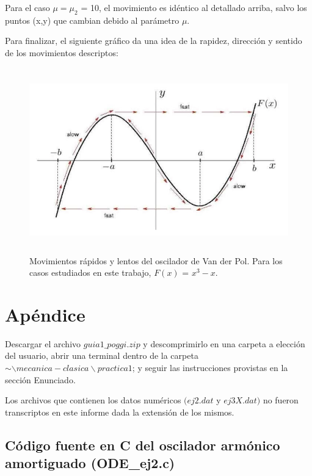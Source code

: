 \documentclass[a4paper,12pt]{article}
\begin{document}
\begin{itemize}
Para el caso $\mu = \mu_2$ = 10, el movimiento es id\'entico al detallado arriba, salvo los puntos (x,y) que cambian debido al par\'ametro $\mu$.

Para finalizar, el siguiente gr\'afico da una idea de la rapidez, direcci\'on y sentido de los movimientos descriptos:


\begin{figure}[H]
\begin{center}
\includegraphics[height=8cm]{grafico_movimientos.jpg}
\caption[width=5cm]{Movimientos r\'apidos y lentos del oscilador de Van der Pol. Para los casos estudiados en este trabajo, $F(x)$ = $x^3 - x$.}
\end{center}
\end{figure}


\end{itemize}

\section{Ap\'endice}

Descargar el archivo $guia1\_poggi.zip$ y descomprimirlo en una carpeta a elecci\'on del usuario, abrir una terminal dentro de la carpeta $\sim \backslash mecanica-clasica\backslash practica1$; y seguir las instrucciones provistas en la secci\'on Enunciado.

Los archivos que contienen los datos num\'ericos $(ej2.dat$ y $ej3X.dat)$ no fueron transcriptos en este informe dada la extensi\'on de los mismos.


\subsection{C\'odigo fuente en C del oscilador arm\'onico amortiguado (ODE\_ej2.c)}
\end{document}
